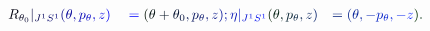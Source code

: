 \documentclass[12pt]{article}
\begin{document}
\makeatletter
\renewcommand*{\@textcolor}[3]{%
  \protect\leavevmode
  \begingroup
    \color#1{#2}#3%
  \endgroup
}
\makeatother
\begin{displaymath}
\begin{array} {rlr} \displaystyle { \mathcolor[RGB]{0,0,15}{R} _ { \mathcolor[RGB]{0,0,30}{\theta} _ { \mathcolor[RGB]{0,0,45}{0} } } \mathcolor[RGB]{0,0,60}{|} _ { \mathcolor[RGB]{0,0,75}{J} ^ { \mathcolor[RGB]{0,0,90}{1} } \mathcolor[RGB]{0,0,105}{S} ^ { \mathcolor[RGB]{0,0,120}{1} } } \mathcolor[RGB]{0,0,135}{(} \mathcolor[RGB]{0,0,150}{\theta} \mathcolor[RGB]{0,0,165}{,} \mathcolor[RGB]{0,0,180}{p} _ { \mathcolor[RGB]{0,0,195}{\theta} } \mathcolor[RGB]{0,0,210}{,} \mathcolor[RGB]{0,0,225}{z} \mathcolor[RGB]{0,0,240}{)} } & \displaystyle { { } \mathcolor[RGB]{0,0,255}{=} \mathcolor[RGB]{0,15,0}{(} \mathcolor[RGB]{0,15,15}{\theta} \mathcolor[RGB]{0,15,30}{+} \mathcolor[RGB]{0,15,45}{\theta} _ { \mathcolor[RGB]{0,15,60}{0} } \mathcolor[RGB]{0,15,75}{,} \mathcolor[RGB]{0,15,90}{p} _ { \mathcolor[RGB]{0,15,105}{\theta} } \mathcolor[RGB]{0,15,120}{,} \mathcolor[RGB]{0,15,135}{z} \mathcolor[RGB]{0,15,150}{)} \mathcolor[RGB]{0,15,165}{;} \mathcolor[RGB]{0,15,180}{\eta} \mathcolor[RGB]{0,15,195}{|} _ { \mathcolor[RGB]{0,15,210}{J} ^ { \mathcolor[RGB]{0,15,225}{1} } \mathcolor[RGB]{0,15,240}{S} ^ { \mathcolor[RGB]{0,15,255}{1} } } \mathcolor[RGB]{0,30,0}{(} \mathcolor[RGB]{0,30,15}{\theta} \mathcolor[RGB]{0,30,30}{,} \mathcolor[RGB]{0,30,45}{p} _ { \mathcolor[RGB]{0,30,60}{\theta} } \mathcolor[RGB]{0,30,75}{,} \mathcolor[RGB]{0,30,90}{z} \mathcolor[RGB]{0,30,105}{)} } & \displaystyle { \mathcolor[RGB]{0,30,120}{=} \mathcolor[RGB]{0,30,135}{(} \mathcolor[RGB]{0,30,150}{\theta} \mathcolor[RGB]{0,30,165}{,} \mathcolor[RGB]{0,30,180}{-} \mathcolor[RGB]{0,30,195}{p} _ { \mathcolor[RGB]{0,30,210}{\theta} } \mathcolor[RGB]{0,30,225}{,} \mathcolor[RGB]{0,30,240}{-} \mathcolor[RGB]{0,30,255}{z} \mathcolor[RGB]{0,45,0}{)} \mathcolor[RGB]{0,45,15}{.} } \end{array}
\end{displaymath}
\end{document}
